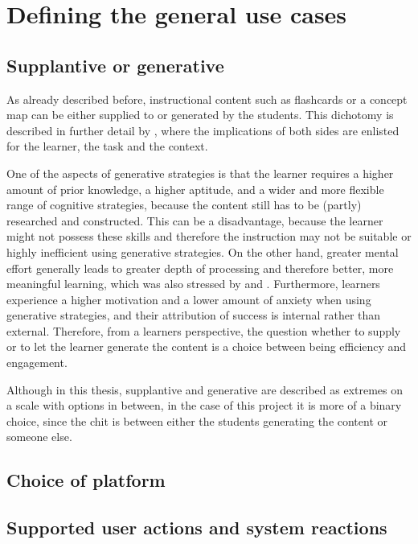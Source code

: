 \chapter{Defining the general use cases}

\section{Supplantive or generative}

As already described before, instructional content such as flashcards or a concept map can be either supplied to or generated by the students. This dichotomy is described in further detail by , where the implications of both sides are enlisted for the learner, the task and the context.

One of the aspects of generative strategies is that the learner requires a higher amount of prior knowledge, a higher aptitude, and a wider and more flexible range of cognitive strategies, because the content still has to be (partly) researched and constructed. This can be a disadvantage, because the learner might not possess these skills and therefore the instruction may not be suitable or highly inefficient using generative strategies. On the other hand, greater mental effort generally leads to greater depth of processing and therefore better, more meaningful learning, which was also stressed by  and . Furthermore, learners experience a higher motivation and a lower amount of anxiety when using generative strategies, and their attribution of success is internal rather than external. Therefore, from a learners perspective, the question whether to supply or to let the learner generate the content is a choice between being efficiency and engagement.

Although in this thesis, supplantive and generative are described as extremes on a scale with options in between, in the case of this project it is more of a binary choice, since the chit is between either the students generating the content or someone else.

\section{Choice of platform}

\section{Supported user actions and system reactions}
